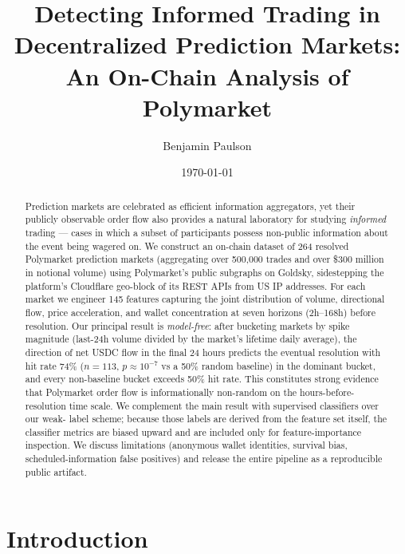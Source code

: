 \documentclass[11pt]{article}
\title{\bfseries Detecting Informed Trading in Decentralized Prediction Markets: \\
  An On-Chain Analysis of Polymarket}
\author[1]{Benjamin Paulson}
\affil[1]{Independent Research}
\date{\today}
\begin{document}
\maketitle

\begin{abstract}
Prediction markets are celebrated as efficient information aggregators, yet
their publicly observable order flow also provides a natural laboratory for
studying \emph{informed} trading --- cases in which a subset of participants
possess non-public information about the event being wagered on. We
construct an on-chain dataset of 264 resolved Polymarket prediction markets
(aggregating over 500{,}000 trades and over \$300 million in notional volume)
using Polymarket's public subgraphs on Goldsky, sidestepping the platform's
Cloudflare geo-block of its REST APIs from US IP addresses. For each market
we engineer 145 features capturing the joint distribution of volume,
directional flow, price acceleration, and wallet concentration at seven
horizons (2h--168h) before resolution. Our principal result is
\emph{model-free}: after bucketing markets by spike magnitude (last-24h
volume divided by the market's lifetime daily average), the direction of
net USDC flow in the final 24 hours predicts the eventual resolution with
hit rate 74\% ($n=113$, $p \approx 10^{-7}$ vs a 50\% random baseline) in
the dominant bucket, and every non-baseline bucket exceeds 50\% hit rate.
This constitutes strong evidence that Polymarket order flow is
informationally non-random on the hours-before-resolution time scale.
We complement the main result with supervised classifiers over our weak-
label scheme; because those labels are derived from the feature set itself,
the classifier metrics are biased upward and are included only for
feature-importance inspection. We discuss limitations (anonymous wallet
identities, survival bias, scheduled-information false positives) and
release the entire pipeline as a reproducible public artifact.
\end{abstract}

\section{Introduction}
\label{sec:intro}
\end{document}
